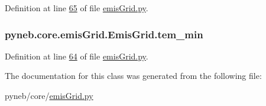 Definition at line \hyperlink{emis_grid_8py_source_l00065}{65} of file \hyperlink{emis_grid_8py_source}{emis\-Grid.\-py}.

\hypertarget{classpyneb_1_1core_1_1emis_grid_1_1_emis_grid_abd8712ac536b051f866429da43f526de}{
\subsubsection[{tem\-\_\-min}]{\setlength{\rightskip}{0pt plus 5cm}pyneb.\-core.\-emis\-Grid.\-Emis\-Grid.\-tem\-\_\-min}}\label{classpyneb_1_1core_1_1emis_grid_1_1_emis_grid_abd8712ac536b051f866429da43f526de}


Definition at line \hyperlink{emis_grid_8py_source_l00064}{64} of file \hyperlink{emis_grid_8py_source}{emis\-Grid.\-py}.



The documentation for this class was generated from the following file\-:\begin{DoxyCompactItemize}
\item 
pyneb/core/\hyperlink{emis_grid_8py}{emis\-Grid.\-py}\end{DoxyCompactItemize}
